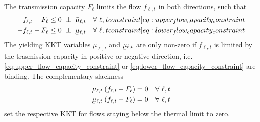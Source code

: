 \documentclass[11pt,twocolumn]{article}
\newcommand{\ubar}[1]{\underaccent{\bar}{#1}}
\newcommand{\capacityFlow}{F_{\ell}}
\newcommand{\mulowerflow}{\ubar{\mu}_{\ell,t}}
\newcommand{\muupperflow}{\bar{\mu}_{\ell,t}}
\newcommand{\flow}{f_{\ell,t}}
\newcommand{\resultsin}[1]{\hspace{6pt} \bot  \hspace{6pt} #1}
\newcommand{\Forall}[1]{\hspace{10pt} \forall \,\, #1 }
\begin{document}
The transmission capacity $\capacityFlow$ limits the flow $\flow$ in both directions, such that 
\begin{align}
 \flow - \capacityFlow &\le 0 \resultsin{\muupperflow} \Forall{\ell,t} 
 \label[constraint]{eq:upper_flow_capacity_constraint} \\
 - \flow - \capacityFlow &\le 0 \resultsin{\mulowerflow} \Forall{\ell,t} 
 \label[constraint]{eq:lower_flow_capacity_constraint}
\end{align}
The yielding KKT variables $\muupperflow$ and $\mulowerflow$ are only non-zero if $\flow$ is limited by the trasmission capacity in positive or negative direction, i.e. \cref{eq:upper_flow_capacity_constraint} or \cref{eq:lower_flow_capacity_constraint} are binding. The complementary slackness 
\begin{align}
 \muupperflow \left( \flow - \capacityFlow \right)  &= 0 \Forall{\ell,t}
 \label{eq:complementary_slackness_upper_flow} \\
 \mulowerflow \left( \flow - \capacityFlow \right) &=  0 \Forall{\ell,t}
 \label{eq:complementary_slackness_lower_flow} 
\end{align}
set the respective KKT for flows staying below the thermal limit to zero. 
\\
\end{document}
